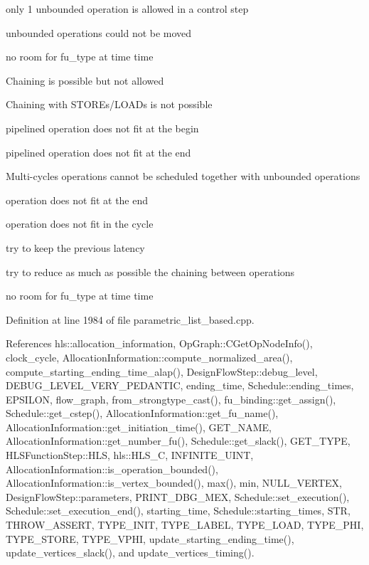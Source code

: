 only 1 unbounded operation is allowed in a control step

unbounded operations could not be moved

no room for fu\+\_\+type at time time

Chaining is possible but not allowed

Chaining with S\+T\+O\+R\+Es/\+L\+O\+A\+Ds is not possible

pipelined operation does not fit at the begin

pipelined operation does not fit at the end

Multi-\/cycles operations cannot be scheduled together with unbounded operations

operation does not fit at the end

operation does not fit in the cycle

try to keep the previous latency

try to reduce as much as possible the chaining between operations

no room for fu\+\_\+type at time time 

Definition at line 1984 of file parametric\+\_\+list\+\_\+based.\+cpp.



References hls\+::allocation\+\_\+information, Op\+Graph\+::\+C\+Get\+Op\+Node\+Info(), clock\+\_\+cycle, Allocation\+Information\+::compute\+\_\+normalized\+\_\+area(), compute\+\_\+starting\+\_\+ending\+\_\+time\+\_\+alap(), Design\+Flow\+Step\+::debug\+\_\+level, D\+E\+B\+U\+G\+\_\+\+L\+E\+V\+E\+L\+\_\+\+V\+E\+R\+Y\+\_\+\+P\+E\+D\+A\+N\+T\+IC, ending\+\_\+time, Schedule\+::ending\+\_\+times, E\+P\+S\+I\+L\+ON, flow\+\_\+graph, from\+\_\+strongtype\+\_\+cast(), fu\+\_\+binding\+::get\+\_\+assign(), Schedule\+::get\+\_\+cstep(), Allocation\+Information\+::get\+\_\+fu\+\_\+name(), Allocation\+Information\+::get\+\_\+initiation\+\_\+time(), G\+E\+T\+\_\+\+N\+A\+ME, Allocation\+Information\+::get\+\_\+number\+\_\+fu(), Schedule\+::get\+\_\+slack(), G\+E\+T\+\_\+\+T\+Y\+PE, H\+L\+S\+Function\+Step\+::\+H\+LS, hls\+::\+H\+L\+S\+\_\+C, I\+N\+F\+I\+N\+I\+T\+E\+\_\+\+U\+I\+NT, Allocation\+Information\+::is\+\_\+operation\+\_\+bounded(), Allocation\+Information\+::is\+\_\+vertex\+\_\+bounded(), max(), min, N\+U\+L\+L\+\_\+\+V\+E\+R\+T\+EX, Design\+Flow\+Step\+::parameters, P\+R\+I\+N\+T\+\_\+\+D\+B\+G\+\_\+\+M\+EX, Schedule\+::set\+\_\+execution(), Schedule\+::set\+\_\+execution\+\_\+end(), starting\+\_\+time, Schedule\+::starting\+\_\+times, S\+TR, T\+H\+R\+O\+W\+\_\+\+A\+S\+S\+E\+RT, T\+Y\+P\+E\+\_\+\+I\+N\+IT, T\+Y\+P\+E\+\_\+\+L\+A\+B\+EL, T\+Y\+P\+E\+\_\+\+L\+O\+AD, T\+Y\+P\+E\+\_\+\+P\+HI, T\+Y\+P\+E\+\_\+\+S\+T\+O\+RE, T\+Y\+P\+E\+\_\+\+V\+P\+HI, update\+\_\+starting\+\_\+ending\+\_\+time(), update\+\_\+vertices\+\_\+slack(), and update\+\_\+vertices\+\_\+timing().



